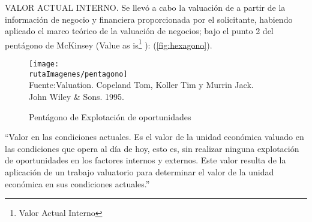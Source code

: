 \textcolor{secundario}{VALOR ACTUAL INTERNO.} Se llev\'o a cabo la valuaci\'on de \bienesValuados{} a partir de la informaci\'on de negocio y financiera proporcionada por el solicitante, habiendo aplicado el marco te\'orico de la valuaci\'on de negocios; bajo el punto 2 del pentágono de McKinsey (Value as is\footnote{Valor Actual Interno} ): (\textcolor{terciario}{\autoref{fig:hexagono}}).

\begin{figure}[H]
\centering
\caption{Pent\'agono de Explotaci\'on de oportunidades\label{fig:hexagono}}
\texttt{[image: \\rutaImagenes/pentagono]}\\
Fuente:Valuation. Copeland Tom, Koller Tim y Murrin Jack.\\

John Wiley \& Sons. 1995.
\end{figure}

``\textcolor{secundario}{Valor en las condiciones actuales.} Es el valor de la unidad econ\'omica valuado en las condiciones que opera al d\'ia de hoy, esto es, sin realizar ninguna explotaci\'on de oportunidades en los factores internos y externos. Este valor resulta de la aplicaci\'on de un trabajo valuatorio para determinar el valor de la unidad econ\'omica en sus condiciones actuales.''